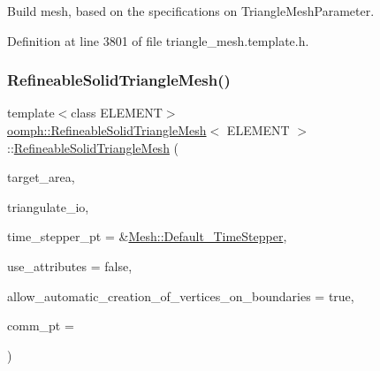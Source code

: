 Build mesh, based on the specifications on Triangle\+Mesh\+Parameter. 



Definition at line 3801 of file triangle\+\_\+mesh.\+template.\+h.

\mbox{\label{classoomph_1_1RefineableSolidTriangleMesh_ab5924620ada32f8f95be71fd0bc6a110}} 
\subsubsection{\texorpdfstring{Refineable\+Solid\+Triangle\+Mesh()}{RefineableSolidTriangleMesh()}\hspace{0.1cm}{\footnotesize\ttfamily [2/2]}}
{\footnotesize\ttfamily template$<$class E\+L\+E\+M\+E\+NT$>$ \\
\hyperlink{classoomph_1_1RefineableSolidTriangleMesh}{oomph\+::\+Refineable\+Solid\+Triangle\+Mesh}$<$ E\+L\+E\+M\+E\+NT $>$\+::\hyperlink{classoomph_1_1RefineableSolidTriangleMesh}{Refineable\+Solid\+Triangle\+Mesh} (\begin{DoxyParamCaption}\item[{const \hyperlink{classoomph_1_1Vector}{Vector}$<$ double $>$ \&}]{target\+\_\+area,  }\item[{\hyperlink{structoomph_1_1TriangulateIO}{Triangulate\+IO} \&}]{triangulate\+\_\+io,  }\item[{\hyperlink{classoomph_1_1TimeStepper}{Time\+Stepper} $\ast$}]{time\+\_\+stepper\+\_\+pt = {\ttfamily \&\hyperlink{classoomph_1_1Mesh_a12243d0fee2b1fcee729ee5a4777ea10}{Mesh\+::\+Default\+\_\+\+Time\+Stepper}},  }\item[{const bool \&}]{use\+\_\+attributes = {\ttfamily false},  }\item[{const bool \&}]{allow\+\_\+automatic\+\_\+creation\+\_\+of\+\_\+vertices\+\_\+on\+\_\+boundaries = {\ttfamily true},  }\item[{\hyperlink{classoomph_1_1OomphCommunicator}{Oomph\+Communicator} $\ast$}]{comm\+\_\+pt = {} }\end{DoxyParamCaption})\hspace{0.3cm}{\ttfamily [inline]}}



